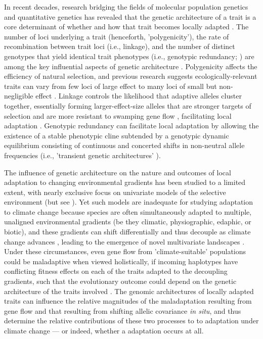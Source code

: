 \documentclass[9pt,twocolumn,twoside,lineno]{pnas-new}
\begin{document}
In recent decades, research bridging the fields
of molecular population genetics
and quantitative genetics
\cite{barghi_polygenic,barton,pritchard_human_adaptation,pritchard_sweeps_alone}
has revealed that the genetic architecture of a trait
is a core determinant of whether and how that trait
becomes locally adapted \cite{yeaman_review}.
The number of loci underlying a trait (henceforth, 'polygenicity'),
the rate of recombination between trait loci (i.e., linkage),
and the number of distinct genotypes that yield identical trait phenotypes
(i.e., genotypic redundancy; \cite{yeaman_review,laruson,barghi_polygenic})
are among the key influential aspects of genetic architecture
\cite{barton,yeaman_whitlock,yeaman_review,lecorre}.
Polygenicity affects the efficiency of natural selection,
and previous research suggests ecologically-relevant traits can vary from
few loci of large effect
\cite{martin,rees}
to many loci of small but non-negligible effect
\cite{boyle,rockman,savolainen,sella,barghi_polygenic}.
Linkage controls the likelihood that adaptive alleles cluster together,
essentially forming larger-effect-size alleles that are stronger 
targets of selection and are more resistant
to swamping gene flow \cite{yeaman_whitlock},
facilitating local adaptation \cite{tigano}.
Genotypic redundancy can facilitate local adaptation 
by allowing the existence of a stable phenotypic cline
subtended by a genotypic dynamic equilibrium
consisting of continuous and concerted shifts in non-neutral allele frequencies
(i.e., 'transient genetic architectures' \cite{barghi_redundancy,manceau,yeaman_amnat}).

The influence of genetic architecture on the nature and outcomes
of local adaptation to changing environmental gradients
has been studied to a limited extent,
with nearly exclusive focus on univariate models
of the selective environment (but see \cite{schiffers}).
Yet such models are inadequate for studying adaptation to climate change
because species are often simultaneously adapted to multiple, unaligned environmental gradients
(be they climatic, physiographic, edaphic, or biotic),
and these gradients can shift differentially and thus decouple as climate change advances
\cite{crimmins,daly},
leading to the emergence of novel multivariate landscapes
\cite{williams_novel_climates,williams_projected_novel_disappearing,fitzpatrick_climate_novelty_forecasts}.
Under these circumstances,
even gene flow from 'climate-suitable' populations
could be maladaptive when viewed holistically, if
incoming haplotypes have conflicting fitness effects
on each of the traits adapted to the decoupling gradients,
such that the evolutionary outcome could depend on
the genetic architecture of the traits involved
\cite{aitken_whitlock,schiffers}.
The genomic architectures of locally adapted traits
can influence the relative magnitudes of the maladaptation resulting from gene flow
and that resulting from shifting allelic covariance \textit{in situ},
and thus determine the relative contributions of these two processes to
to adaptation under climate change --- or indeed,
whether a adaptation occurs at all.
\end{document}
